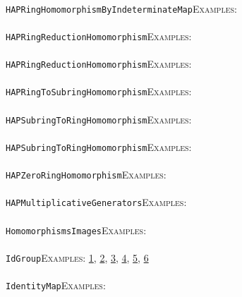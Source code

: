 \documentclass[a4paper,11pt]{report}
\begin{document}
{{ \\
 \texttt{HAPRingHomomorphismByIndeterminateMap}{\nobreakspace}{\nobreakspace}{\nobreakspace}{\nobreakspace}\textsc{Examples:} \\
 \\
 \texttt{HAPRingReductionHomomorphism}{\nobreakspace}{\nobreakspace}{\nobreakspace}{\nobreakspace}\textsc{Examples:} \\
 \\
 \texttt{HAPRingReductionHomomorphism}{\nobreakspace}{\nobreakspace}{\nobreakspace}{\nobreakspace}\textsc{Examples:} \\
 \\
 \texttt{HAPRingToSubringHomomorphism}{\nobreakspace}{\nobreakspace}{\nobreakspace}{\nobreakspace}\textsc{Examples:} \\
 \\
 \texttt{HAPSubringToRingHomomorphism}{\nobreakspace}{\nobreakspace}{\nobreakspace}{\nobreakspace}\textsc{Examples:} \\
 \\
 \texttt{HAPSubringToRingHomomorphism}{\nobreakspace}{\nobreakspace}{\nobreakspace}{\nobreakspace}\textsc{Examples:} \\
 \\
 \texttt{HAPZeroRingHomomorphism}{\nobreakspace}{\nobreakspace}{\nobreakspace}{\nobreakspace}\textsc{Examples:} \\
 \\
 \texttt{HAP{\textunderscore}MultiplicativeGenerators}{\nobreakspace}{\nobreakspace}{\nobreakspace}{\nobreakspace}\textsc{Examples:} \\
 \\
 \texttt{HomomorphismsImages}{\nobreakspace}{\nobreakspace}{\nobreakspace}{\nobreakspace}\textsc{Examples:} \\
 \\
 \texttt{IdGroup}{\nobreakspace}{\nobreakspace}{\nobreakspace}{\nobreakspace}\textsc{Examples:} \href{tutorial/chap5.html} {1}{\nobreakspace}, \href{../www/SideLinks/About/aboutBogomolov.html} {2}{\nobreakspace}, \href{../www/SideLinks/About/aboutPersistent.html} {3}{\nobreakspace}, \href{../www/SideLinks/About/aboutQuandles.html} {4}{\nobreakspace}, \href{../www/SideLinks/About/aboutquasi.html} {5}{\nobreakspace}, \href{../www/SideLinks/About/aboutGouter.html} {6}{\nobreakspace} \\
 \\
 \texttt{IdentityMap}{\nobreakspace}{\nobreakspace}{\nobreakspace}{\nobreakspace}\textsc{Examples:} \\
}}
\end{document}
